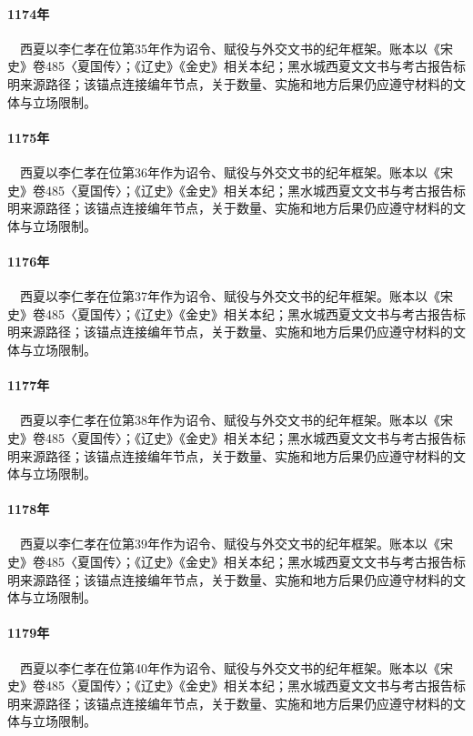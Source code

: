 \paragraph{1174年}　西夏以李仁孝在位第35年作为诏令、赋役与外交文书的纪年框架。账本以《宋史》卷485〈夏国传〉；《辽史》《金史》相关本纪；黑水城西夏文文书与考古报告标明来源路径；该锚点连接编年节点，关于数量、实施和地方后果仍应遵守材料的文体与立场限制。

\paragraph{1175年}　西夏以李仁孝在位第36年作为诏令、赋役与外交文书的纪年框架。账本以《宋史》卷485〈夏国传〉；《辽史》《金史》相关本纪；黑水城西夏文文书与考古报告标明来源路径；该锚点连接编年节点，关于数量、实施和地方后果仍应遵守材料的文体与立场限制。

\paragraph{1176年}　西夏以李仁孝在位第37年作为诏令、赋役与外交文书的纪年框架。账本以《宋史》卷485〈夏国传〉；《辽史》《金史》相关本纪；黑水城西夏文文书与考古报告标明来源路径；该锚点连接编年节点，关于数量、实施和地方后果仍应遵守材料的文体与立场限制。

\paragraph{1177年}　西夏以李仁孝在位第38年作为诏令、赋役与外交文书的纪年框架。账本以《宋史》卷485〈夏国传〉；《辽史》《金史》相关本纪；黑水城西夏文文书与考古报告标明来源路径；该锚点连接编年节点，关于数量、实施和地方后果仍应遵守材料的文体与立场限制。

\paragraph{1178年}　西夏以李仁孝在位第39年作为诏令、赋役与外交文书的纪年框架。账本以《宋史》卷485〈夏国传〉；《辽史》《金史》相关本纪；黑水城西夏文文书与考古报告标明来源路径；该锚点连接编年节点，关于数量、实施和地方后果仍应遵守材料的文体与立场限制。

\paragraph{1179年}　西夏以李仁孝在位第40年作为诏令、赋役与外交文书的纪年框架。账本以《宋史》卷485〈夏国传〉；《辽史》《金史》相关本纪；黑水城西夏文文书与考古报告标明来源路径；该锚点连接编年节点，关于数量、实施和地方后果仍应遵守材料的文体与立场限制。

